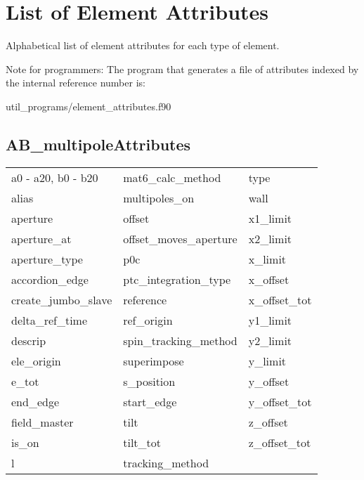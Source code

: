 \chapter{List of Element Attributes}
\label{c:attrib.list}

Alphabetical list of element attributes for each type of element. 

Note for programmers: The program that generates a file of attributes indexed by the
internal reference number is:
\begin{example}
  util_programs/element_attributes.f90 
\end{example}

 \section{AB_multipoleAttributes}
 \label{s:list.ab.multipole}
 
 \begin{tabular}{lll} \toprule
a0 - a20, b0 - b20          & mat6_calc_method            & type                        \\
alias                       & multipoles_on               & wall                        \\
aperture                    & offset                      & x1_limit                    \\
aperture_at                 & offset_moves_aperture       & x2_limit                    \\
aperture_type               & p0c                         & x_limit                     \\
accordion_edge              & ptc_integration_type        & x_offset                    \\
create_jumbo_slave          & reference                   & x_offset_tot                \\
delta_ref_time              & ref_origin                  & y1_limit                    \\
descrip                     & spin_tracking_method        & y2_limit                    \\
ele_origin                  & superimpose                 & y_limit                     \\
e_tot                       & s_position                  & y_offset                    \\
end_edge                    & start_edge                  & y_offset_tot                \\
field_master                & tilt                        & z_offset                    \\
is_on                       & tilt_tot                    & z_offset_tot                \\
l                           & tracking_method             &                             \\
 \bottomrule
 \end{tabular}
 \vfill
 
